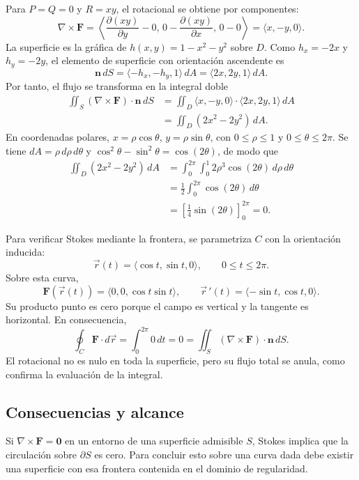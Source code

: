 Para $P=Q=0$ y $R=xy$, el rotacional se obtiene por componentes:
\[
\nabla\times\mathbf F
=\left\langle
\frac{\partial(xy)}{\partial y}-0,\,
0-\frac{\partial(xy)}{\partial x},\,0-0
\right\rangle
=\langle x,-y,0\rangle.
\]
La superficie es la gráfica de $h(x,y)=1-x^2-y^2$ sobre $D$. Como $h_x=-2x$ y $h_y=-2y$, el elemento de superficie con orientación ascendente es
\[
\mathbf n\,dS=\langle-h_x,-h_y,1\rangle\,dA
=\langle2x,2y,1\rangle\,dA.
\]
Por tanto, el flujo se transforma en la integral doble
\begin{align*}
\iint_S(\nabla\times\mathbf F)\cdot\mathbf n\,dS
&=\iint_D\langle x,-y,0\rangle\cdot\langle2x,2y,1\rangle\,dA\\
&=\iint_D(2x^2-2y^2)\,dA.
\end{align*}
En coordenadas polares, $x=\rho\cos\theta$, $y=\rho\sin\theta$, con $0\leq\rho\leq1$ y $0\leq\theta\leq2\pi$. Se tiene $dA=\rho\,d\rho\,d\theta$ y $\cos^2\theta-\sin^2\theta=\cos(2\theta)$, de modo que
\begin{align*}
\iint_D(2x^2-2y^2)\,dA
&=\int_0^{2\pi}\int_0^1 2\rho^3\cos(2\theta)\,d\rho\,d\theta\\
&=\frac12\int_0^{2\pi}\cos(2\theta)\,d\theta\\
&=\left[\frac14\sin(2\theta)\right]_0^{2\pi}=0.
\end{align*}

Para verificar Stokes mediante la frontera, se parametriza $C$ con la orientación inducida:
\[
\vec r(t)=\langle\cos t,\sin t,0\rangle,
\qquad 0\leq t\leq2\pi.
\]
Sobre esta curva,
\[
\mathbf F(\vec r(t))=\langle0,0,\cos t\sin t\rangle,
\qquad \vec r\,'(t)=\langle-\sin t,\cos t,0\rangle.
\]
Su producto punto es cero porque el campo es vertical y la tangente es horizontal. En consecuencia,
\[
\oint_C\mathbf F\cdot d\vec r
=\int_0^{2\pi}0\,dt=0
=\iint_S(\nabla\times\mathbf F)\cdot\mathbf n\,dS.
\]
El rotacional no es nulo en toda la superficie, pero su flujo total se anula, como confirma la evaluación de la integral.

\subsection{Consecuencias y alcance}

Si $\nabla\times\mathbf F=\mathbf0$ en un entorno de una superficie admisible $S$, Stokes implica que la circulación sobre $\partial S$ es cero. Para concluir esto sobre una curva dada debe existir una superficie con esa frontera contenida en el dominio de regularidad.

